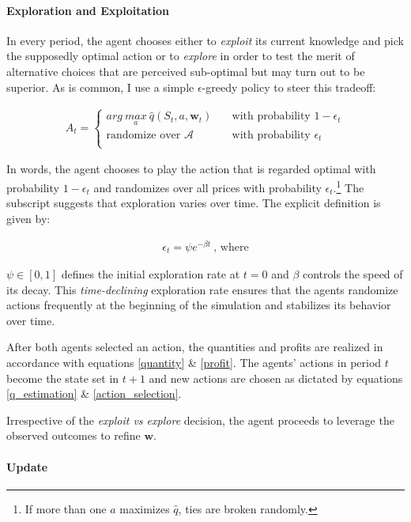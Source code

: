 \paragraph{Exploration and Exploitation} 
In every period, the agent chooses either to \emph{exploit} its current knowledge and pick the supposedly optimal action or to \emph{explore} in order to test the merit of alternative choices that are perceived sub-optimal but may turn out to be superior. As is common, I use a simple $\epsilon$-greedy policy to steer this tradeoff:

\begin{gather}\label{action_selection}
 A_t = \begin{cases} arg ~\underset{a}{max} ~ \hat{q}(S_t,a,\boldsymbol{w}_t) & \quad \text{with probability } 1 - \epsilon_t\\
\text{randomize over } \mathcal{A} & \quad \text{with probability } \epsilon_t\\ \end{cases} 
\end{gather}

In words, the agent chooses to play the action that is regarded optimal with probability $1-\epsilon_t$ and randomizes over all prices with probability $\epsilon_t$.\footnote{If more than one $a$ maximizes $\hat{q}$, ties are broken randomly.} The subscript suggests that exploration varies over time. The explicit definition is given by:

\begin{gather}
	\epsilon_t = \psi e^{-\beta t}~ \text{, where}
\end{gather}

$\psi \in [0, 1]$ defines the initial exploration rate at $t = 0$ and $\beta$ controls the speed of its decay. This \emph{time-declining} exploration rate ensures that the agents randomize actions frequently at the beginning of the simulation and stabilizes its behavior over time. 

After both agents selected an action, the quantities and profits are realized in accordance with equations \ref{quantity} \& \ref{profit}. The agents' actions in period $t$ become the state set in $t+1$ and new actions are chosen as dictated by equations \ref{q_estimation} \& \ref{action_selection}.

Irrespective of the \emph{exploit vs explore} decision, the agent proceeds to leverage the observed outcomes to refine $\boldsymbol{w}$.



\paragraph{Update}

